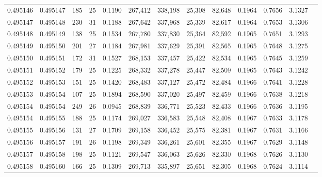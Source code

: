 \begin{tabular}{rrrrrrrrrrrrr}
0.495146 & 0.495147 & 185 &  25 &                                     0.1190 & 267,412 & 338,198 &  25,308 &  82,648 & 0.1964 & 0.7656 & 3.1327 \\
0.495147 & 0.495148 & 230 &  31 &                                     0.1188 & 267,642 & 337,968 &  25,339 &  82,617 & 0.1964 & 0.7653 & 3.1306 \\
0.495148 & 0.495149 & 138 &  25 &                                     0.1534 & 267,780 & 337,830 &  25,364 &  82,592 & 0.1965 & 0.7651 & 3.1293 \\
0.495149 & 0.495150 & 201 &  27 &                                     0.1184 & 267,981 & 337,629 &  25,391 &  82,565 & 0.1965 & 0.7648 & 3.1275 \\
0.495150 & 0.495151 & 172 &  31 &                                     0.1527 & 268,153 & 337,457 &  25,422 &  82,534 & 0.1965 & 0.7645 & 3.1259 \\
0.495151 & 0.495152 & 179 &  25 &                                     0.1225 & 268,332 & 337,278 &  25,447 &  82,509 & 0.1965 & 0.7643 & 3.1242 \\
0.495152 & 0.495153 & 151 &  25 &                                     0.1420 & 268,483 & 337,127 &  25,472 &  82,484 & 0.1966 & 0.7641 & 3.1228 \\
0.495153 & 0.495154 & 107 &  25 &                                     0.1894 & 268,590 & 337,020 &  25,497 &  82,459 & 0.1966 & 0.7638 & 3.1218 \\
0.495154 & 0.495154 & 249 &  26 &                                     0.0945 & 268,839 & 336,771 &  25,523 &  82,433 & 0.1966 & 0.7636 & 3.1195 \\
0.495154 & 0.495155 & 188 &  25 &                                     0.1174 & 269,027 & 336,583 &  25,548 &  82,408 & 0.1967 & 0.7633 & 3.1178 \\
0.495155 & 0.495156 & 131 &  27 &                                     0.1709 & 269,158 & 336,452 &  25,575 &  82,381 & 0.1967 & 0.7631 & 3.1166 \\
0.495156 & 0.495157 & 191 &  26 &                                     0.1198 & 269,349 & 336,261 &  25,601 &  82,355 & 0.1967 & 0.7629 & 3.1148 \\
0.495157 & 0.495158 & 198 &  25 &                                     0.1121 & 269,547 & 336,063 &  25,626 &  82,330 & 0.1968 & 0.7626 & 3.1130 \\
0.495158 & 0.495160 & 166 &  25 &                                     0.1309 & 269,713 & 335,897 &  25,651 &  82,305 & 0.1968 & 0.7624 & 3.1114 \\

\end{tabular}
